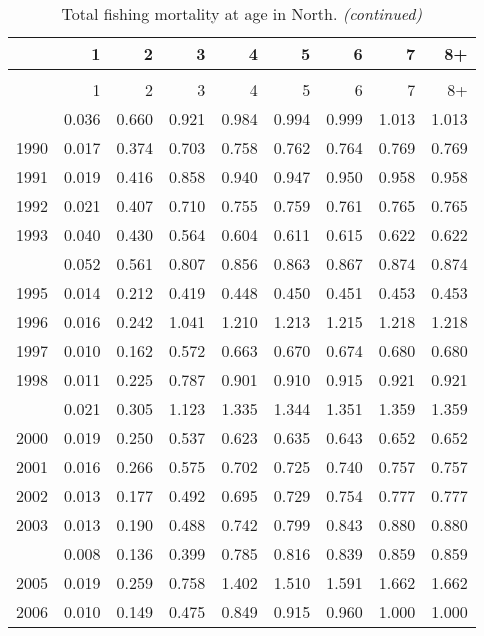 \documentclass[
]{article}
\begin{document}
\begin{longtable}[t]{lrrrrrrrr}
\caption{\label{tab:North-region-FAA-table}Total fishing mortality at age in North.}\\
\toprule
  & 1 & 2 & 3 & 4 & 5 & 6 & 7 & 8+\\
\midrule
\endfirsthead
\caption[]{Total fishing mortality at age in North. \textit{(continued)}}\\
\toprule
  & 1 & 2 & 3 & 4 & 5 & 6 & 7 & 8+\\
\midrule
\endhead

\endfoot
\bottomrule
\endlastfoot
1989 & 0.036 & 0.660 & 0.921 & 0.984 & 0.994 & 0.999 & 1.013 & 1.013\\
1990 & 0.017 & 0.374 & 0.703 & 0.758 & 0.762 & 0.764 & 0.769 & 0.769\\
1991 & 0.019 & 0.416 & 0.858 & 0.940 & 0.947 & 0.950 & 0.958 & 0.958\\
1992 & 0.021 & 0.407 & 0.710 & 0.755 & 0.759 & 0.761 & 0.765 & 0.765\\
1993 & 0.040 & 0.430 & 0.564 & 0.604 & 0.611 & 0.615 & 0.622 & 0.622\\
\addlinespace
1994 & 0.052 & 0.561 & 0.807 & 0.856 & 0.863 & 0.867 & 0.874 & 0.874\\
1995 & 0.014 & 0.212 & 0.419 & 0.448 & 0.450 & 0.451 & 0.453 & 0.453\\
1996 & 0.016 & 0.242 & 1.041 & 1.210 & 1.213 & 1.215 & 1.218 & 1.218\\
1997 & 0.010 & 0.162 & 0.572 & 0.663 & 0.670 & 0.674 & 0.680 & 0.680\\
1998 & 0.011 & 0.225 & 0.787 & 0.901 & 0.910 & 0.915 & 0.921 & 0.921\\
\addlinespace
1999 & 0.021 & 0.305 & 1.123 & 1.335 & 1.344 & 1.351 & 1.359 & 1.359\\
2000 & 0.019 & 0.250 & 0.537 & 0.623 & 0.635 & 0.643 & 0.652 & 0.652\\
2001 & 0.016 & 0.266 & 0.575 & 0.702 & 0.725 & 0.740 & 0.757 & 0.757\\
2002 & 0.013 & 0.177 & 0.492 & 0.695 & 0.729 & 0.754 & 0.777 & 0.777\\
2003 & 0.013 & 0.190 & 0.488 & 0.742 & 0.799 & 0.843 & 0.880 & 0.880\\
\addlinespace
2004 & 0.008 & 0.136 & 0.399 & 0.785 & 0.816 & 0.839 & 0.859 & 0.859\\
2005 & 0.019 & 0.259 & 0.758 & 1.402 & 1.510 & 1.591 & 1.662 & 1.662\\
2006 & 0.010 & 0.149 & 0.475 & 0.849 & 0.915 & 0.960 & 1.000 & 1.000\\

\end{longtable}
\end{document}
